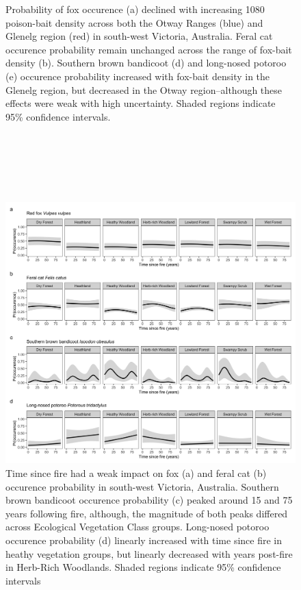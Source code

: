 \documentclass[11pt,a4paper,titlepage,twoside,openright]{style/unimelbthesis}
\begin{document}
\begin{mainmatter}
\begin{figure}
{}

\caption{Probability of fox occurence (a) declined with increasing 1080 poison-bait density across both the Otway Ranges (blue) and Glenelg region (red) in south-west Victoria, Australia. Feral cat occurence probability remain unchanged across the range of fox-bait density (b). Southern brown bandicoot (d) and long-nosed potoroo (e) occurence probability increased with fox-bait density in the Glenelg region, but decreased in the Otway region--although these effects were weak with high uncertainty. Shaded regions indicate 95\% confidence intervals.}\label{fig:foxbaits}
\end{figure}
\newpage

\(~\)

\(~\)

\(~\)
\begin{figure}

{\centering \includegraphics[width=1\linewidth]{figure/c1/tsf} 

}

\caption{Time since fire had a weak impact on fox (a) and feral cat (b) occurence probability in south-west Victoria, Australia. Southern brown bandicoot occurence probability (c) peaked around 15 and 75 years following fire, although, the magnitude of both peaks differed across Ecological Vegetation Class groups. Long-nosed potoroo occurence probability (d) linearly increased with time since fire in heathy vegetation groups, but linearly decreased with years post-fire in Herb-Rich Woodlands. Shaded regions indicate 95\% confidence intervals}\label{fig:tsf}
\end{figure}
\newpage


\end{mainmatter}
\end{document}
